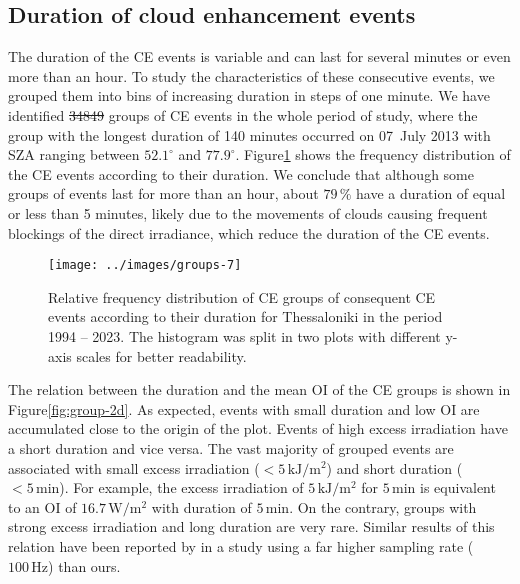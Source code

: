 \documentclass[preprint, 5p,
authoryear]{elsarticle} %
\providecommand{\DIFaddtex}[1]{{\protect\color{blue}\uwave{#1}}} %
\providecommand{\DIFdeltex}[1]{{\protect\color{red}\sout{#1}}}                      %
\providecommand{\DIFaddbegin}{} %
\providecommand{\DIFaddend}{} %
\providecommand{\DIFdelbegin}{} %
\providecommand{\DIFdelend}{} %
\providecommand{\DIFadd}[1]{\texorpdfstring{\DIFaddtex{#1}}{#1}} %
\providecommand{\DIFdel}[1]{\texorpdfstring{\DIFdeltex{#1}}{}} %
\newcommand{\DIFscaledelfig}{0.5}
\newlength{\DIFdelgraphicswidth} %
\newlength{\DIFdelgraphicsheight} %
\newcommand{\DIFaddincludegraphics}[2][]{{\color{blue}\fbox{\DIFOincludegraphics[#1]{#2}}}} %
\newcommand{\DIFdelincludegraphics}[2][]{%
\sbox{\DIFdelgraphicsbox}{\DIFOincludegraphics[#1]{#2}}%
\settoboxwidth{\DIFdelgraphicswidth}{\DIFdelgraphicsbox} %
\settoboxtotalheight{\DIFdelgraphicsheight}{\DIFdelgraphicsbox} %
\scalebox{\DIFscaledelfig}{%
\parbox[b]{\DIFdelgraphicswidth}{\usebox{\DIFdelgraphicsbox}\\[-\baselineskip] \rule{\DIFdelgraphicswidth}{0em}}\llap{\resizebox{\DIFdelgraphicswidth}{\DIFdelgraphicsheight}{%
\setlength{\unitlength}{\DIFdelgraphicswidth}%
\begin{picture}(1,1)%
\thicklines\linethickness{2pt} %
{\color[rgb]{1,0,0}\put(0,0){\framebox(1,1){}}}%
{\color[rgb]{1,0,0}\put(0,0){\line( 1,1){1}}}%
{\color[rgb]{1,0,0}\put(0,1){\line(1,-1){1}}}%
\end{picture}%
}\hspace*{3pt}}} %
} %
\DeclareRobustCommand{\DIFaddbegin}{\DIFOaddbegin \let\includegraphics\DIFaddincludegraphics} %
\DeclareRobustCommand{\DIFaddend}{\DIFOaddend \let\includegraphics\DIFOincludegraphics} %
\DeclareRobustCommand{\DIFdelbegin}{\DIFOdelbegin \let\includegraphics\DIFdelincludegraphics} %
\DeclareRobustCommand{\DIFdelend}{\DIFOaddend \let\includegraphics\DIFOincludegraphics} %
\begin{document}
\hypertarget{duration-of-cloud-enhancement-events}{%
\subsection{Duration of cloud enhancement
events}\label{duration-of-cloud-enhancement-events}}

The duration of the CE events is variable and can last for several
minutes or even more than an hour. To study the characteristics of these
consecutive events, we grouped them into bins of increasing duration in
steps of one minute. We have identified \DIFdelbegin \DIFdel{34849 }\DIFdelend \DIFaddbegin \DIFadd{35342 }\DIFaddend groups of CE events in the
whole period of study, where the group with the longest duration of 140
minutes occurred on 07~July 2013 with SZA ranging between \(52.1^\circ\)
and \(77.9^\circ\).
Figure\nobreakspace{}\ref{fig:ceg-duration-distribution} shows the
frequency distribution of the CE events according to their duration. We
conclude that although some groups of events last for more than an hour,
about \(79\,\%\) have a duration of equal or less than 5 minutes, likely
due to the movements of clouds causing frequent blockings of the direct
irradiance, which reduce the duration of the CE events.

\begin{figure}

{\centering \texttt{[image: ../images/groups-7]} 

}

\caption{Relative frequency distribution of CE groups of consequent CE events according to their duration for Thessaloniki in the period 1994 -- 2023. The histogram was split in two plots with different y-axis scales for better readability.}\label{fig:ceg-duration-distribution}
\end{figure}

The relation between the duration and the mean OI of the CE groups is
shown in Figure\nobreakspace{}\ref{fig:group-2d}. As expected, events
with small duration and low OI are accumulated close to the origin of
the plot. Events of high excess irradiation have a short duration and
vice versa. The vast majority of grouped events are associated with
small excess irradiation (\(<5\,\text{kJ}/\text{m}^2\)) and short
duration (\(<5\,\text{min}\)). For example, the excess irradiation of
\(5\,\text{kJ}/\text{m}^2\) for \(5\,\text{min}\) is equivalent to an OI
of \(16.7\,\text{W}/\text{m}^2\) with duration of \(5\,\text{min}\). On
the contrary, groups with strong excess irradiation and long duration
are very rare. Similar results of this relation have been reported by
\citet{Zhang2018} in a study using a far higher sampling rate
(\(100\,\text{Hz}\)) than ours.
\end{document}
